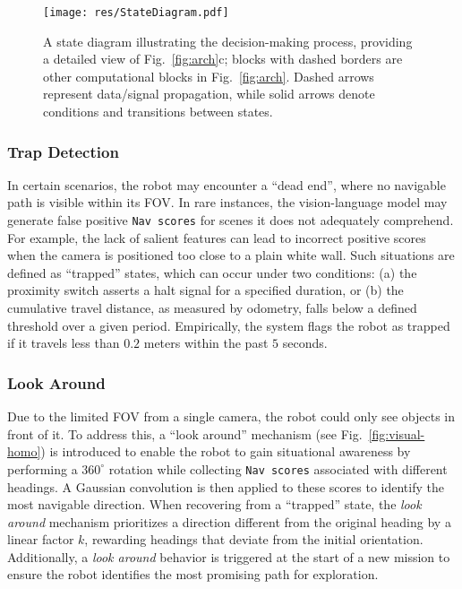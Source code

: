 \begin{figure}
    \centering
    \texttt{[image: res/StateDiagram.pdf]}%
    \vspace{-1mm}
    \caption{
        A state diagram illustrating the decision-making process, providing a detailed view of Fig.~\ref{fig:arch}c; blocks with dashed borders are other computational blocks in Fig.~\ref{fig:arch}. Dashed arrows represent data/signal propagation, while solid arrows denote conditions and transitions between states.
    }%
    \label{fig:state-diagram}
    \vspace{-1mm}
\end{figure}

\subsubsection{Trap Detection}
In certain scenarios, the robot may encounter a ``dead end'', where no navigable path is visible within its FOV. In rare instances, the vision-language model may generate false positive \texttt{Nav scores} for scenes it does not adequately comprehend. For example, the lack of salient features can lead to incorrect positive scores when the camera is positioned too close to a plain white wall. Such situations are defined as ``trapped'' states, which can occur under two conditions: (a) the proximity switch asserts a halt signal for a specified duration, or (b) the cumulative travel distance, as measured by odometry, falls below a defined threshold over a given period. Empirically, the system flags the robot as trapped if it travels less than $0.2$ meters within the past $5$ seconds.


\subsubsection{Look Around}\label{sec:arch/look-around}
Due to the limited FOV from a single camera, the robot could only see objects in front of it. 
To address this, a ``look around'' mechanism (see Fig.~\ref{fig:visual-homo}) is introduced to enable the robot to gain situational awareness by performing a $360^\circ$ rotation while collecting \texttt{Nav scores} associated with different headings. A Gaussian convolution is then applied to these scores to identify the most navigable direction. When recovering from a ``trapped'' state, the \textit{look around} mechanism prioritizes a direction different from the original heading by a linear factor 
$k$, rewarding headings that deviate from the initial orientation. Additionally, a \textit{look around} behavior is triggered at the start of a new mission to ensure the robot identifies the most promising path for exploration. 



